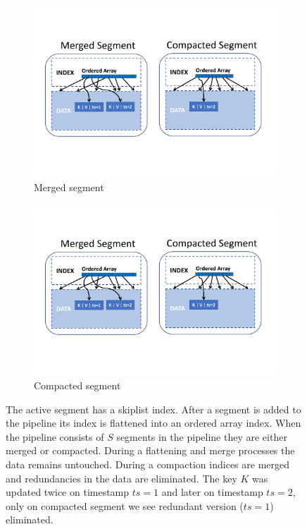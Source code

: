 \begin{figure}[tb]
\begin{subfigure}[t]{0.5\columnwidth}
      \includegraphics[width=\figw]{merged-seg.pdf}
      \caption[]{Merged segment}
    \label{fig:flattening:merge}
  \end{subfigure}
  \begin{subfigure}[t]{0.5\columnwidth}
      \includegraphics[width=\figw]{compacted-seg.pdf}
      \caption[]{Compacted segment}
    \label{fig:flattening:compaction}
  \end{subfigure}

\caption{The active segment has a skiplist index. After a segment is added to the pipeline its index is flattened into an ordered array index. When the pipeline consists of $S$ segments in the pipeline they are either merged or compacted. During a flattening and merge processes the data remains untouched. During a compaction indices are merged and redundancies in the data are eliminated. The key $K$ was updated twice on timestamp $ts=1$ and later on timestamp $ts=2$, only on compacted segment we see redundant version ($ts=1$) eliminated.} 
\label{fig:flattening}
\end{figure}

